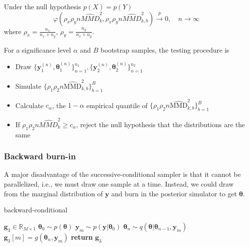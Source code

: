 \documentclass{article}
\begin{document}
Under the null hypothesis $p(X) = p(Y)$
\begin{equation*}
    \varphi\left(\rho_{x} \rho_{y} n \widehat{MMD}^{2}_{k}, \rho_{x} \rho_{y} n \widehat{MMD}^{2}_{k, b}\right) \xrightarrow[]{p} 0, \quad n\rightarrow \infty
\end{equation*}
where $\rho_{x} = \frac{n_{x}}{n_{x} + n_{y}}$, $\rho_{y} = \frac{n_{y}}{n_{x} + n_{y}}$.

For a significance level $\alpha$ and $B$ bootstrap samples, the testing procedure is
\begin{itemize}
    \item Draw $\{\mathbf{y}_{1}^{(n)}, \mathbf{\theta}_{1}^{(n)}\}_{n=1}^{n_{1}}, \{\mathbf{y}_{2}^{(n)}, \mathbf{\theta}_{2}^{(n)}\}_{n=1}^{n_{2}}$
    \item Simulate $\{\rho_{1} \rho_{2} n \widehat{\mathrm{MMD}}^{2}_{k, b}\}_{b=1}^{B}$
    \item Calculate $c_{\alpha}$, the $1-\alpha$ empirical quantile of $\{\rho_{1} \rho_{2} n \widehat{\mathrm{MMD}}^{2}_{k, b}\}_{b=1}^{B}$
    \item If $\rho_{1} \rho_{2} n \widehat{MMD}^{2}_{k} \geq c_{\alpha} $, reject the null hypothesis that the distributions are the same
\end{itemize}

\subsubsection{Backward burn-in}
A major disadvantage of the successive-conditional sampler is that it cannot be parallelized, i.e., we must draw one sample at a time. Instead, we could draw from the marginal distribution of $\mathbf{y}$ and burn in the posterior simulator to get $\mathbf{\theta}$. 

\begin{algorithm}[H]
    \centering
    \caption{backward-conditional}\label{alg:bc-sampler}
    \begin{algorithmic}[1]
        \State {} $\mathbf{g}_{3} \in \mathbb{R}_{M\times 1}$
            \State $\mathbf{\theta}_{0} \sim p(\mathbf{\theta})$ 
            \State $\mathbf{y}_{m} \sim p(\mathbf{y}|\mathbf{\theta}_{0})$ 
                \State $\mathbf{\theta}_{n} \sim q(\mathbf{\theta}|\mathbf{\theta}_{n-1}, \mathbf{y}_{m})$ 
            \EndFor
            \State $\mathbf{g}_{3}[m] = g(\mathbf{\theta}_{n}, \mathbf{y}_{m})$ 
        \EndFor        
        \State \textbf{return} $\mathbf{g}_{3}$
    \end{algorithmic}
\end{algorithm}
\end{document}

